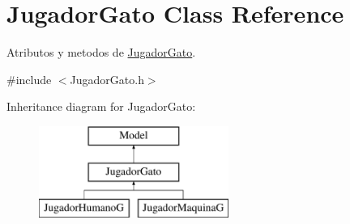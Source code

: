 \hypertarget{class_jugador_gato}{}\section{Jugador\+Gato Class Reference}
\label{class_jugador_gato}


Atributos y metodos de \hyperlink{class_jugador_gato}{Jugador\+Gato}.  




{\ttfamily \#include $<$Jugador\+Gato.\+h$>$}

Inheritance diagram for Jugador\+Gato\+:\begin{figure}[H]
\begin{center}
\leavevmode
\includegraphics[height=3.000000cm]{class_jugador_gato}
\end{center}
\end{figure}
